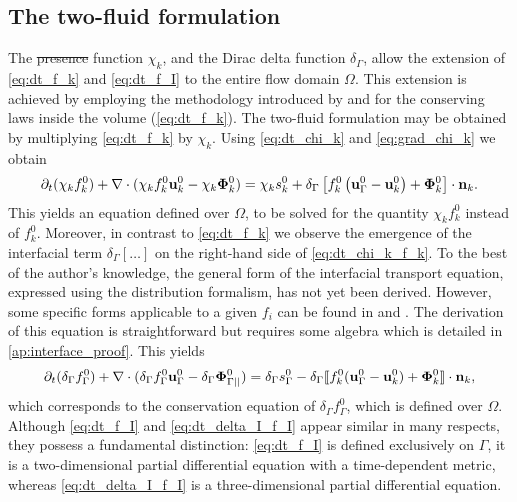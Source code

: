 \documentclass[11pt]{My_preprint}
\providecommand{\DIFadd}[1]{{\protect\color{blue}\uwave{#1}}} %
\providecommand{\DIFdel}[1]{{\protect\color{red}\sout{#1}}}                      %
\providecommand{\DIFaddbegin}{} %
\providecommand{\DIFaddend}{} %
\providecommand{\DIFdelbegin}{} %
\providecommand{\DIFdelend}{} %
\begin{document}
 


\subsection{The two-fluid formulation}
The \DIFdelbegin \DIFdel{presence }\DIFdelend \DIFaddbegin \DIFadd{phase indicator }\DIFaddend function $\chi_k$, and the Dirac delta function $\delta_\Gamma $, allow the extension of \ref{eq:dt_f_k} and \ref{eq:dt_f_I} to the entire flow domain $\Omega$. 
This extension is achieved by employing the methodology introduced by \citet{drew1983mathematical} and \citet{kataoka1986local} for the conserving laws inside the volume (\ref{eq:dt_f_k}).
The two-fluid formulation may be obtained by multiplying \ref{eq:dt_f_k} by $\chi_k$. 
Using \ref{eq:dt_chi_k} and \ref{eq:grad_chi_k} we obtain
\begin{equation}
    \pddt (\chi_k f_k^0)
    + \div (
        \chi_k f_k^0 \textbf{u}_k^0
        - \chi_k \mathbf{\Phi}_k^0 
        )
    = 
    \chi_k s_k^0
    + \delta_\Gamma \left[
        f_k^0
        \left(
            \textbf{u}_\Gamma^0
            - \textbf{u}_k^0
        \right)
        + \mathbf{\Phi}_k^0
    \right]
    \cdot \textbf{n}_k.
    \label{eq:dt_chi_k_f_k}
\end{equation}
This yields an equation defined over $\Omega$, to be solved for the quantity $\chi_k f_k^0$ instead of $f_k^0$. 
Moreover, in contrast to \ref{eq:dt_f_k} we observe the emergence of the interfacial term $ \delta_\Gamma [\ldots]$ on the right-hand side of \ref{eq:dt_chi_k_f_k}. 
To the best of the author's knowledge, the general form of the interfacial transport equation, expressed using the distribution formalism, has not yet been derived. However, some specific forms applicable to a given $f_i$ can be found in \citet{marle1982macroscopic} and  \citet{teigen2009}.
The derivation of this equation is straightforward but requires some algebra which is detailed in \ref{ap:interface_proof}. This yields\begin{equation}
    \pddt (\delta_\Gamma f_\Gamma^0)  
    + \div (
        \delta_\Gamma  f_\Gamma^0 \textbf{u}_\Gamma^0
        - \delta_\Gamma  \mathbf{\Phi}_{\Gamma||}^0 
        )
    = 
    \delta_\Gamma s_\Gamma^0
    - \delta_\Gamma \Jump{
    f_k^0 (\textbf{u}_\Gamma^0 - \textbf{u}_k^0)
    + \mathbf{\Phi}_k^0},
    \label{eq:dt_delta_I_f_I}
\end{equation}
which corresponds to the conservation equation of $\delta_\Gamma f_\Gamma^0$, which is defined over $\Omega$.
Although \ref{eq:dt_f_I} and \ref{eq:dt_delta_I_f_I} appear similar in many respects, they possess a fundamental distinction: \ref{eq:dt_f_I} is defined exclusively on $\Gamma$, it is a two-dimensional partial differential equation with a time-dependent metric, whereas \ref{eq:dt_delta_I_f_I} is a three-dimensional partial differential equation. 
\end{document}
